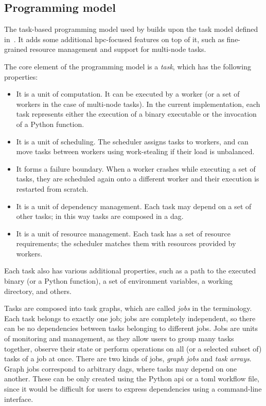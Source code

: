 \subsection{Programming model}
\label{sec:hq-programming-model}
The task-based programming model used by \hyperqueue{} builds upon the task model defined
in~. It adds some additional \gls{hpc}-focused features on top
of it, such as fine-grained resource management and support for multi-node tasks.

The core element of the programming model is a \emph{task}, which has the following
properties:
\begin{itemize}[itemsep=0pt,topsep=4pt]
	\item It is a unit of computation. It can be executed by a worker (or a set of workers in the case of
	      multi-node tasks). In the current implementation, each task represents either the execution of a
	      binary executable or the invocation of a Python function.
	\item It is a unit of scheduling. The scheduler assigns tasks to workers, and can move tasks between
	      workers using work-stealing if their load is unbalanced.
	\item It forms a failure boundary. When a worker crashes while executing a set of tasks, they are
	      scheduled again onto a different worker and their execution is restarted from scratch.
	\item It is a unit of dependency management. Each task may depend on a set of other tasks; in this way
	      tasks are composed in a \gls{dag}.
	\item It is a unit of resource management. Each task has a set of resource requirements; the scheduler
	      matches them with resources provided by workers.
\end{itemize}

Each task also has various additional properties, such as a path to the executed binary (or a
Python function), a set of environment variables, a working directory, and others.

Tasks are composed into task graphs, which are called \emph{jobs} in the
\hq{} terminology. Each task belongs to exactly one job; jobs are completely
independent, so there can be no dependencies between tasks belonging to different jobs. Jobs are
units of monitoring and management, as they allow users to group many tasks together, observe their
state or perform operations on all (or a selected subset of) tasks of a job at once. There are two
kinds of jobs, \emph{graph jobs} and \emph{task arrays}. Graph jobs correspond to
arbitrary \glspl{dag}, where tasks may depend on one another. These can be only created
using the Python \gls{api} or a \gls{toml} workflow file, since it would
be difficult for users to express dependencies using a command-line interface.

